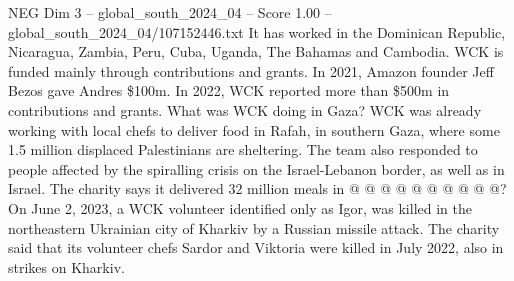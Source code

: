 \begin{textsample}{NEG Dim 3 – global\_south\_2024\_04 – Score 1.00 – global\_south\_2024\_04/107152446.txt}
It has worked in the Dominican Republic, Nicaragua, Zambia, Peru, Cuba, Uganda, The Bahamas and Cambodia.
WCK is funded mainly through contributions and grants.
In 2021, Amazon founder Jeff Bezos gave Andres \$100m.
In 2022, WCK reported more than \$500m in contributions and grants.
What was WCK doing in Gaza?
WCK was already working with local chefs to deliver food in Rafah, in southern Gaza, where some 1.5 million displaced Palestinians are sheltering.
The team also responded to people affected by the spiralling crisis on the Israel-Lebanon border, as well as in Israel.
The charity says it delivered 32 million meals in @ @ @ @ @ @ @ @ @ @?
On June 2, 2023, a WCK volunteer identified only as Igor, was killed in the northeastern Ukrainian city of Kharkiv by a Russian missile attack.
The charity said that its volunteer chefs Sardor and Viktoria were killed in July 2022, also in strikes on Kharkiv.

\end{textsample}
